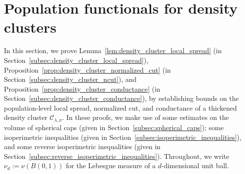 \documentclass{article}
\newcommand{\1}{\mathbf{1}}
\newcommand{\mc}[1]{\mathcal{#1}}
\theoremstyle{definition}
\theoremstyle{remark}
\begin{document}
\section{Population functionals for density clusters}
\label{sec:density_cluster_population_functionals}
In this section, we prove Lemma~\ref{lem:density_cluster_local_spread} (in Section~\ref{subsec:density_cluster_local_spread}), Proposition~\ref{prop:density_cluster_normalized_cut} (in Section~\ref{subsec:density_cluster_ncut}), and Proposition~\ref{prop:density_cluster_conductance} (in Section~\ref{subsec:density_cluster_conductance}), by establishing bounds on the population-level local spread, normalized cut, and conductance of a thickened density cluster $\mc{C}_{\lambda,\sigma}$. In these proofs, we make use of some estimates on the volume of spherical caps (given in Section~\ref{subsec:spherical_caps}); some isoperimetric inequalities (given in Section~\ref{subsec:isoperimetric_inequalities}), and some reverse isoperimetric inequalities (given in Section~\ref{subsec:reverse_isoperimetric_inequalities}). Throughout, we write $\nu_d := \nu(B(0,1))$ for the Lebesgue measure of a $d$-dimensional unit ball.
\end{document}
